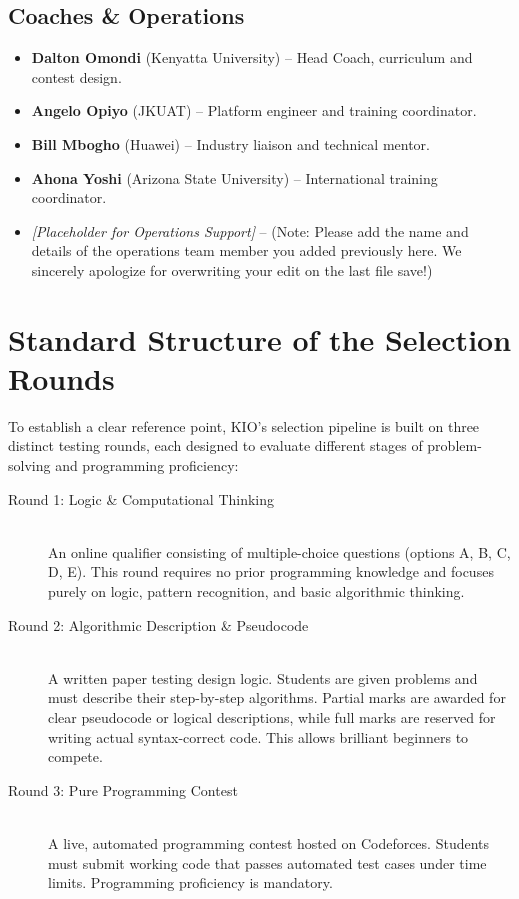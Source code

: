 \documentclass[11pt]{article}
\begin{document}
\subsection{Coaches \& Operations}
\begin{itemize}
    \item \textbf{Dalton Omondi} (Kenyatta University) -- Head Coach, curriculum and contest design.
    \item \textbf{Angelo Opiyo} (JKUAT) -- Platform engineer and training coordinator.
    \item \textbf{Bill Mbogho} (Huawei) -- Industry liaison and technical mentor.
    \item \textbf{Ahona Yoshi} (Arizona State University) -- International training coordinator.
    \item \textit{[Placeholder for Operations Support]} -- (Note: Please add the name and details of the operations team member you added previously here. We sincerely apologize for overwriting your edit on the last file save!)
\end{itemize}

\section{Standard Structure of the Selection Rounds}
To establish a clear reference point, KIO's selection pipeline is built on three distinct testing rounds, each designed to evaluate different stages of problem-solving and programming proficiency:

\begin{description}
    \item[Round 1: Logic \& Computational Thinking] \hfill \\
    An online qualifier consisting of multiple-choice questions (options A, B, C, D, E). This round requires no prior programming knowledge and focuses purely on logic, pattern recognition, and basic algorithmic thinking.
    
    \item[Round 2: Algorithmic Description \& Pseudocode] \hfill \\
    A written paper testing design logic. Students are given problems and must describe their step-by-step algorithms. Partial marks are awarded for clear pseudocode or logical descriptions, while full marks are reserved for writing actual syntax-correct code. This allows brilliant beginners to compete.
    
    \item[Round 3: Pure Programming Contest] \hfill \\
    A live, automated programming contest hosted on Codeforces. Students must submit working code that passes automated test cases under time limits. Programming proficiency is mandatory.
\end{description}
\end{document}
